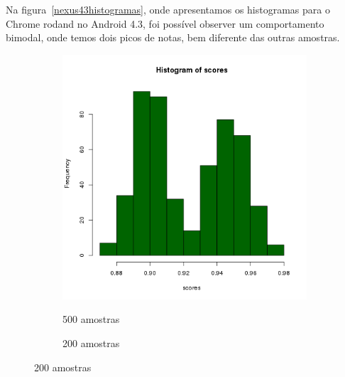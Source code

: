 \documentclass[11pt,a4paper]{article}
\begin{document}
Na figura~\ref{nexus43histogramas}, onde apresentamos os histogramas para o Chrome rodand no Android 4.3, foi possível
observer um comportamento bimodal, onde temos dois picos de notas, bem diferente das outras amostras.

\begin{figure}
    \caption{Histogramas - Nexus 7, Android 4.3 Chrome}
    \label{nexus43histogramas}
    \begin{subfigure}{.5\textwidth}
        \caption{500 amostras}
        \centering
        \includegraphics[width=\textwidth]{images/hist-freq-n7-a43-chrome-500-amostras-20131119}
        \label{nexus43histograma500}
    \end{subfigure}
    \begin{subfigure}{.5\textwidth}
        \caption{200 amostras}
        \centering

\end{subfigure}
\end{figure}
\end{document}
